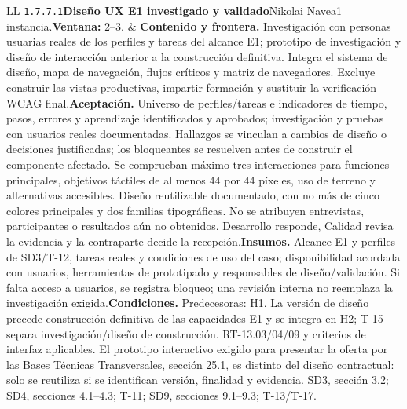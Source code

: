 \begin{longtable}{L{\tabcolsep\relax}L{\tabcolsep\relax}}
\texttt{1.\allowbreak{}7.\allowbreak{}7.\allowbreak{}1}\newline{}\textbf{Diseño UX E1 investigado y validado}\newline{}Nikolai Navea\newline{}1 instancia.\newline{}\textbf{Ventana:} 2--3. & \textbf{Contenido y frontera.} Investigación con personas usuarias reales de los perfiles y tareas del alcance E1; prototipo de investigación y diseño de interacción anterior a la construcción definitiva. Integra el sistema de diseño, mapa de navegación, flujos críticos y matriz de navegadores. Excluye construir las vistas productivas, impartir formación y sustituir la verificación WCAG final.\newline{}\textbf{Aceptación.} Universo de perfiles/tareas e indicadores de tiempo, pasos, errores y aprendizaje identificados y aprobados; investigación y pruebas con usuarios reales documentadas. Hallazgos se vinculan a cambios de diseño o decisiones justificadas; los bloqueantes se resuelven antes de construir el componente afectado. Se comprueban máximo tres interacciones para funciones principales, objetivos táctiles de al menos 44 por 44 píxeles, uso de terreno y alternativas accesibles. Diseño reutilizable documentado, con no más de cinco colores principales y dos familias tipográficas. No se atribuyen entrevistas, participantes o resultados aún no obtenidos. Desarrollo responde, Calidad revisa la evidencia y la contraparte decide la recepción.\newline{}\textbf{Insumos.} Alcance E1 y perfiles de SD3/T-12, tareas reales y condiciones de uso del caso; disponibilidad acordada con usuarios, herramientas de prototipado y responsables de diseño/validación. Si falta acceso a usuarios, se registra bloqueo; una revisión interna no reemplaza la investigación exigida.\newline{}\textbf{Condiciones.} Predecesoras: H1. La versión de diseño precede construcción definitiva de las capacidades E1 y se integra en H2; T-15 separa investigación/diseño de construcción. RT-13.03/04/09 y criterios de interfaz aplicables. El prototipo interactivo exigido para presentar la oferta por las Bases Técnicas Transversales, sección 25.1, es distinto del diseño contractual: solo se reutiliza si se identifican versión, finalidad y evidencia. SD3, sección 3.2; SD4, secciones 4.1--4.3; T-11; SD9, secciones 9.1--9.3; T-13/T-17.\\\hline

\end{longtable}
